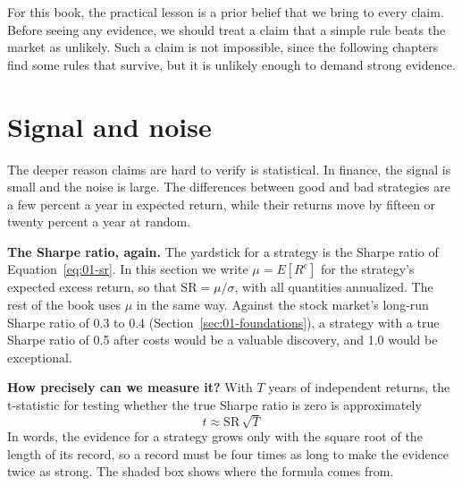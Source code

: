 For this book, the practical lesson is a prior belief that we bring to every claim. Before seeing any evidence, we should treat a claim that a simple rule beats the market as unlikely. Such a claim is not impossible, since the following chapters find some rules that survive, but it is unlikely enough to demand strong evidence.

\section{Signal and noise}
\label{sec:01-signal-noise}

The deeper reason claims are hard to verify is statistical. In finance, the signal is small and the noise is large. The differences between good and bad strategies are a few percent a year in expected return, while their returns move by fifteen or twenty percent a year at random.

\textbf{The Sharpe ratio, again.} The yardstick for a strategy is the Sharpe ratio of Equation~\eqref{eq:01-sr}. In this section we write $\mu = E[R^{e}]$ for the strategy's expected excess return, so that $\mathrm{SR} = \mu/\sigma$, with all quantities annualized. The rest of the book uses $\mu$ in the same way. Against the stock market's long-run Sharpe ratio of 0.3 to 0.4 (Section~\ref{sec:01-foundations}), a strategy with a true Sharpe ratio of 0.5 after costs would be a valuable discovery, and 1.0 would be exceptional.

\textbf{How precisely can we measure it?} With $T$ years of independent returns, the t-statistic for testing whether the true Sharpe ratio is zero is approximately
\begin{equation}
  t \approx \mathrm{SR}\,\sqrt{T}
  \label{eq:01-t}
\end{equation}
In words, the evidence for a strategy grows only with the square root of the length of its record, so a record must be four times as long to make the evidence twice as strong. The shaded box shows where the formula comes from.

